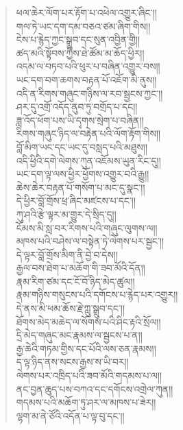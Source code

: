 \documentclass{article}
\begin{document}
\begin{verse}
    ཕལ་ཆེར་ལོག་པར་རྟོག་པ་འཕེལ་འགྱུར་ཞིང༌།། \\
    གལ་ཏེ་ཡང་དག་དམ་བཅའ་ཙམ་ཞིག་གིས།། \\
    ངེས་པ་རྙེད་ཀྱང་སྒྲུབ་དང་སུན་འབྱིན་གྱི།། \\
    ཚད་མའི་སྟོབས་ཀྱིས་ཐེ་ཚོམ་མ་ཆོད་ཕྱིར།། \\
    འདམ་ལ་བཏབ་པའི་ཕུར་པ་བཞིན་འགྱུར་བས།། \\
    ཡང་དག་བག་ཆགས་བརྟན་པོ་འཇོག་མི་ནུས།། \\
    འདི་ན་རིགས་གཞུང་གཉིས་ལ་རབ་སྦྱངས་ཀྱང༌།། \\
    ཤར་དུ་འགྲོ་འདོད་ནུབ་ཏུ་བགྲོད་པ་དང།། \\
    ཟླ་འོད་ཕོག་པས་ཡི་དྭགས་སྲེག་པ་བཞིན།། \\
    རིགས་གཞུང་ཉིད་ལ་བརྟེན་པའི་ལོག་རྟོག་གིས།། \\
    བློ་མིག་ཡང་དང་ཡང་དུ་བསླད་པའི་མཐུས།། \\
    འདི་ཕྱིའི་དགེ་ལེགས་ཀུན་འཇོམས་ཡུན་རིང་དུ།། \\
    ཡང་དག་ལྟ་ལས་ཕྱིར་ཕྱོགས་འགྱུར་བའི་རྒྱུ།། \\
    ཆེས་ཆེར་བརྟན་པོ་གསོག་པ་མང་དུ་སྣང༌།། \\
    དེ་ཕྱིར་བློ་གྲོས་ཕྲ་ཞིང་མཛངས་པ་དང༌།། \\
    ཀུ་ཤའི་རྩེ་ལྟར་མ་གྱུར་དེ་སྲིད་དུ།། \\
    ངོམས་མི་སླ་བར་རིགས་པའི་གཞུང་ལུགས་ལ།། \\
    མཁས་པའི་བཤེས་ལ་བསྟེན་ཏེ་ལེགས་པར་སྦྱང༌།། \\
    དེ་ལྟར་བློ་གྲོས་མིག་ནི་བྱེ་བ་དེས།། \\
    རྒྱལ་བས་ཐེག་པ་མཆོག་གི་ཟབ་མོའི་དོན།། \\
    རྣམ་རིག་ཙམ་དང་ངོ་བོ་ཉིད་མེད་ཚུལ།། \\
    རྣམ་གཉིས་གསུངས་པའི་དགོངས་པ་རྙེད་པར་འགྱུར།། \\
    དེ་ནས་མི་ཕམ་ཆོས་རྗེ་ཀླུ་སྒྲུབ་དང༌།། \\
    ཐོགས་མེད་མཆེད་ལ་སོགས་པའི་ཤིང་རྟའི་སྲོལ།། \\
    དྲི་མེད་གཞུང་མང་རྣམས་ལ་སྦྱངས་པ་ན།། \\
    རྒྱ་ཆེའི་གཏམ་གྱིས་དང་པོའི་ལས་ཅན་རྣམས།། \\
    ད་ལྟ་ཉིད་ནས་སངས་རྒྱས་ས་ཡི་བར།། \\
    ལེགས་པར་འཁྲིད་པའི་ཟབ་མོའི་གདམས་པ་ལ།། \\
    ནང་བྱན་ཆུད་པས་བཀའ་དང་དགོངས་འགྲེལ་ཀུན།། \\
    གདམས་པའི་མཆོག་ཏུ་ཤར་ལ་མཁས་པ་ཟེར།། \\
    ལྷག་མ་ནེ་ཙོའི་འདོན་པ་ལྟ་བུ་དང༌།། \\

\end{verse}
\end{document}
